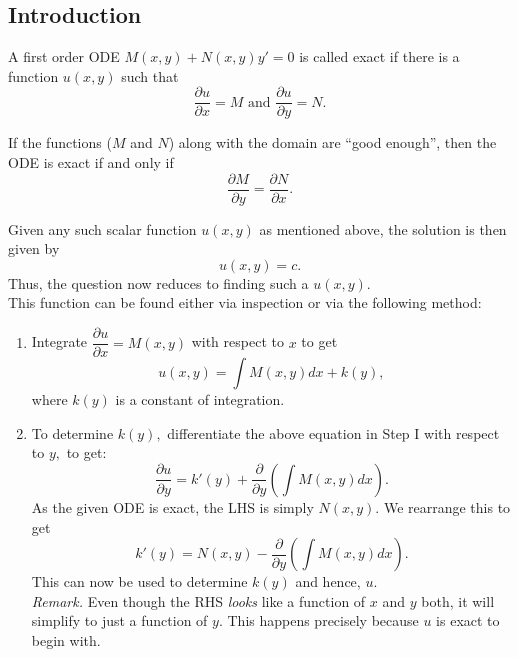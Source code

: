 \subsection{Introduction}
\begin{defn} 
	A first order ODE $M(x, y) + N(x, y)y' = 0$ is called exact if there is a function $u(x, y)$ such that
	\[\dfrac{\partial u}{\partial x} = M \text{ and } \dfrac{\partial u}{\partial y} = N.\]
\end{defn}
\begin{mdframed}[style=boxstyle, frametitle={Identifying such an ODE}]
If the functions ($M$ and $N$) along with the domain are ``good enough'', then the ODE is exact if and only if
\[\dfrac{\partial M}{\partial y} = \dfrac{\partial N}{\partial x}.\]
\end{mdframed}
\newpage
\begin{mdframed}[style=boxstyle, frametitle={The Solution}]
Given any such scalar function $u(x, y)$ as mentioned above, the solution is then given by 
\[u(x, y) = c.\]
Thus, the question now reduces to finding such a $u(x, y).$\\
This function can be found either via inspection or via the following method:
\begin{enumerate}[leftmargin = *, label = \Roman*:]
	\item Integrate $\dfrac{\partial u}{\partial x} = M(x, y)$ with respect to $x$ to get 
	\[u(x, y) = \int M(x, y) dx + k(y),\]
	where $k(y)$ is a constant of integration.
	\item To determine $k(y),$ differentiate the above equation in Step I with respect to $y,$ to get:
	\[\frac{\partial u}{\partial y} = k'(y) + \frac{\partial}{\partial y}\left(\int M(x, y) dx\right).\]
	As the given ODE is exact, the LHS is simply $N(x, y).$ We rearrange this to get
	\[k'(y) = N(x, y) - \frac{\partial}{\partial y}\left(\int M(x, y) dx\right).\]
	This can now be used to determine $k(y)$ and hence, $u.$\\
	\emph{Remark.} Even though the RHS \emph{looks} like a function of $x$ and $y$ both, it will simplify to just a function of $y.$ This happens precisely because $u$ is exact to begin with.
\end{enumerate}
\end{mdframed}	
%
\newpage
